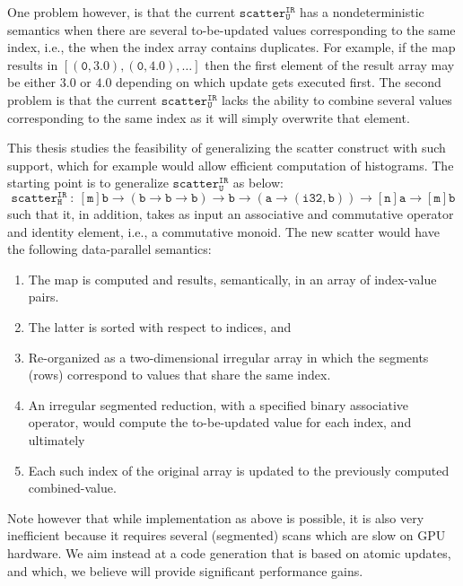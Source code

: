 One problem however, is that the current
$\mathtt{scatter^{IR}_{U}}$ has a nondeterministic semantics
when there are several to-be-updated values corresponding to
the same index, i.e., the when the index array contains
duplicates. For example, if the map results in $\mathtt{[(0,
    3.0), (0, 4.0), \dots]}$ then the first element of the
result array may be either $\mathtt{3.0}$ or $\mathtt{4.0}$
depending on which update gets executed first. The second
problem is that the current $\mathtt{scatter^{IR}_{U}}$
lacks the ability to combine several values corresponding to
the same index as it will simply overwrite that element.

This thesis studies the feasibility of generalizing the
scatter construct with such support, which for example would
allow efficient computation of histograms. The starting
point is to generalize $\mathtt{scatter^{IR}_{U}}$ as below:
%
\begin{equation}
  \mathtt{scatter^{IR}_{H}} \ : \
  \mathtt{[m]b} \rightarrow
  \mathtt{(b \rightarrow b \rightarrow b)} \rightarrow
  \mathtt{b} \rightarrow
  \mathtt{(a \rightarrow (i32, b))} \rightarrow
  \mathtt{[n]a} \rightarrow
  \mathtt{[m]b}
\end{equation}
%
such that it, in addition, takes as input an associative and
commutative operator and identity element, i.e., a
commutative monoid. The new scatter would have the following
data-parallel semantics:
%
\begin{enumerate}
  \item The map is computed and results, semantically, in an
    array of index-value pairs.
  \item The latter is sorted with respect to indices, and
  \item Re-organized as a two-dimensional irregular array in
    which the segments (rows) correspond to values that
    share the same index.
  \item An irregular segmented reduction, with a specified
    binary associative operator, would compute the
    to-be-updated value for each index, and ultimately
  \item Each such index of the original array is updated to
    the previously computed combined-value.
\end{enumerate}
%

Note however that while implementation as above is possible,
it is also very inefficient because it requires several
(segmented) scans which are slow on GPU hardware. We aim
instead at a code generation that is based on atomic
updates, and which, we believe will provide significant
performance gains.


